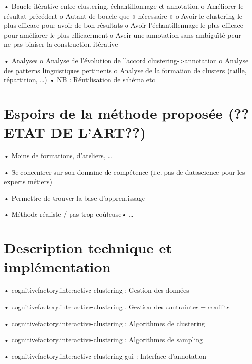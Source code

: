         •	Boucle itérative entre clustering, échantillonnage et annotation
            o	Améliorer le résultat précédent
            o	Autant de boucle que « nécessaire »
            o	Avoir le clustering le plus efficace pour avoir de bon résultats
            o	Avoir l’échantillonnage le plus efficace pour améliorer le plus efficacement
            o	Avoir une annotation sans ambiguïté pour ne pas biaiser la construction itérative

        •	Analyses
            o	Analyse de l’évolution de l’accord clustering->annotation
            o	Analyse des patterns linguistiques pertinents
            o	Analyse de la formation de clusters (taille, répartition, …)
        •	NB : Réutilisation de schéma etc
    
    \section{Espoirs de la méthode proposée (??ETAT DE L'ART??)}

        •	Moins de formations, d’ateliers, …

        •	Se concentrer sur son domaine de compétence (i.e. pas de datascience pour les experts métiers)

        •	Permettre de trouver la base d’apprentissage

        •	Méthode réaliste / pas trop coûteuse•	…
    
    \section{Description technique et implémentation}

        •	cognitivefactory.interactive-clustering : Gestion des données
    
        •	cognitivefactory.interactive-clustering : Gestion des contraintes + conflits

        •	cognitivefactory.interactive-clustering : Algorithmes de clustering

        •	cognitivefactory.interactive-clustering : Algorithmes de sampling

        •	cognitivefactory.interactive-clustering-gui : Interface d’annotation


